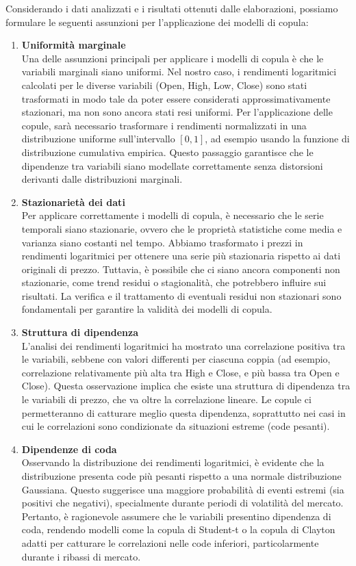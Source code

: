 \documentclass[%
	corpo=11pt,
    twoside,
    stile=classica,
    oldstyle,
    tipotesi=custom,
    greek,
    evenboxes,
]{toptesi}
\begin{document}
Considerando i dati analizzati e i risultati ottenuti dalle elaborazioni, possiamo formulare le seguenti assunzioni per l’applicazione dei modelli di copula:

\begin{enumerate}
	\item \textbf{Uniformità marginale} \\
	Una delle assunzioni principali per applicare i modelli di copula è che le variabili marginali siano uniformi. Nel nostro caso, i rendimenti logaritmici calcolati per le diverse variabili (Open, High, Low, Close) sono stati trasformati in modo tale da poter essere considerati approssimativamente stazionari, ma non sono ancora stati resi uniformi. Per l’applicazione delle copule, sarà necessario trasformare i rendimenti normalizzati in una distribuzione uniforme sull’intervallo \([0,1]\), ad esempio usando la funzione di distribuzione cumulativa empirica. Questo passaggio garantisce che le dipendenze tra variabili siano modellate correttamente senza distorsioni derivanti dalle distribuzioni marginali.
	
	\item \textbf{Stazionarietà dei dati} \\
	Per applicare correttamente i modelli di copula, è necessario che le serie temporali siano stazionarie, ovvero che le proprietà statistiche come media e varianza siano costanti nel tempo. Abbiamo trasformato i prezzi in rendimenti logaritmici per ottenere una serie più stazionaria rispetto ai dati originali di prezzo. Tuttavia, è possibile che ci siano ancora componenti non stazionarie, come trend residui o stagionalità, che potrebbero influire sui risultati. La verifica e il trattamento di eventuali residui non stazionari sono fondamentali per garantire la validità dei modelli di copula.
	
	\item \textbf{Struttura di dipendenza} \\
	L’analisi dei rendimenti logaritmici ha mostrato una correlazione positiva tra le variabili, sebbene con valori differenti per ciascuna coppia (ad esempio, correlazione relativamente più alta tra High e Close, e più bassa tra Open e Close). Questa osservazione implica che esiste una struttura di dipendenza tra le variabili di prezzo, che va oltre la correlazione lineare. Le copule ci permetteranno di catturare meglio questa dipendenza, soprattutto nei casi in cui le correlazioni sono condizionate da situazioni estreme (code pesanti).
	
	\item \textbf{Dipendenze di coda} \\
	Osservando la distribuzione dei rendimenti logaritmici, è evidente che la distribuzione presenta code più pesanti rispetto a una normale distribuzione Gaussiana. Questo suggerisce una maggiore probabilità di eventi estremi (sia positivi che negativi), specialmente durante periodi di volatilità del mercato. Pertanto, è ragionevole assumere che le variabili presentino dipendenza di coda, rendendo modelli come la copula di Student-t o la copula di Clayton adatti per catturare le correlazioni nelle code inferiori, particolarmente durante i ribassi di mercato.
	

\end{enumerate}
\end{document}
